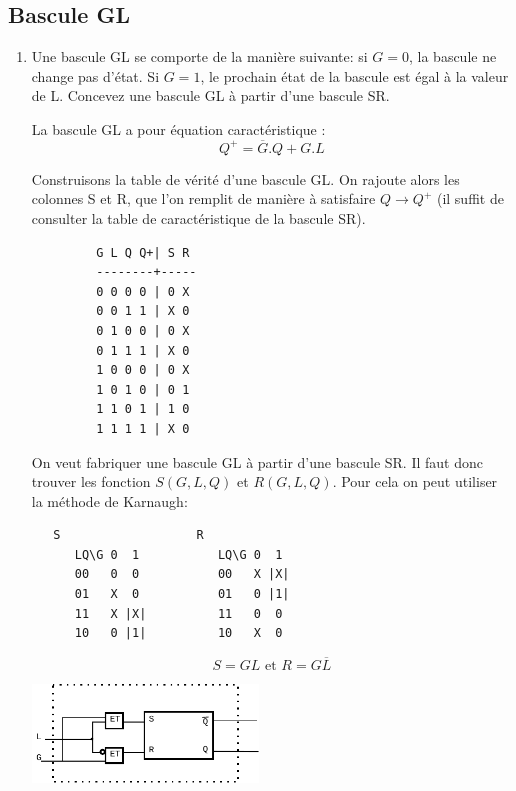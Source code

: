 \documentclass[a4paper,10pt]{exam}
\begin{document}
\subsection{Bascule GL}
\begin{enumerate}
  \item Une bascule GL se comporte de la manière suivante: si $G = 0$, la
    bascule ne change pas d'état. Si $G = 1$, le prochain état de la bascule
    est égal à la valeur de L. Concevez une bascule GL à partir d'une bascule
    SR.

    \begin{solution}

      La bascule GL a pour équation caractéristique :
      $$ Q^{+} = \overline{G}.Q + G.L $$

      Construisons la table de vérité d'une bascule GL.
      On rajoute alors les colonnes S et R, que l'on remplit de manière
      à satisfaire $Q \rightarrow Q^{+}$ (il suffit de consulter la table
      de caractéristique de la bascule SR).

\begin{verbatim}
         G L Q Q+| S R
         --------+-----
         0 0 0 0 | 0 X
         0 0 1 1 | X 0
         0 1 0 0 | 0 X
         0 1 1 1 | X 0
         1 0 0 0 | 0 X
         1 0 1 0 | 0 1
         1 1 0 1 | 1 0
         1 1 1 1 | X 0
\end{verbatim}

      On veut fabriquer une bascule GL à partir d'une bascule SR.
      Il faut donc trouver les fonction $S(G,L,Q)$ et $R(G,L,Q)$.
      Pour cela on peut utiliser la méthode de Karnaugh:

\begin{verbatim}
   S                   R
      LQ\G 0  1           LQ\G 0  1
      00   0  0           00   X |X|
      01   X  0           01   0 |1|
      11   X |X|          11   0  0
      10   0 |1|          10   X  0
\end{verbatim}

$$ S = GL \textrm{ et } R = G\overline{L} $$

      \includegraphics[width=6cm]{TD8-GL}
    \end{solution}

\end{enumerate}
\end{document}
